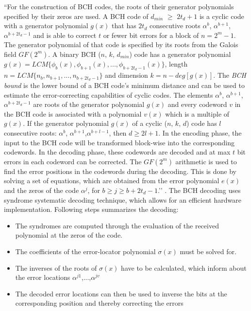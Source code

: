 ``For the construction of BCH codes, the roots of their generator polynomials specified by their zeros are used. A BCH code of $d_{min}$ $\geq$ $2t_d + 1$ is a cyclic code with a generator polynomial $g(x)$ that has $2t_d$ consecutive roots $\alpha^b$, $\alpha^{b+1}$,$\alpha^{b+2t_d-1}$ and is able to correct $t$ or fewer bit errors for a block of $n = 2^m - 1$. The generator polynomial of that code is specified by its roots from the Galois field $GF(2^m)$. A binary BCH ($n$, $k$, $d_{min}$) code
has a generator polynomial $g(x) = LCM\{\phi_{b}(x), \phi_{b+1}(x),...,\phi_{b+2t_{d}-1}(x)\}$, length $n = LCM\{n_b,n_{b+1},...,n_{b+2t_d-1}\}$ and dimension $k = n - deg[g(x)]$. The \emph{BCH bound} is the lower bound of a BCH code’s minimum distance and can be used to estimate the error-correcting capabilities of cyclic codes. The elements $\alpha^b$, $\alpha^{b+1}$,$\alpha^{b+2t_d-1}$ are roots of the generator polynomial $g(x)$ and every codeword $v$ in the BCH code is associated with a
polynomial $v(x)$ which is a multiple of $g(x)$. If the generator polynomial $g(x)$ of a cyclic ($n$, $k$, $d$) code has $l$ consecutive roots: $\alpha^b$, $\alpha^{b+1}$,$\alpha^{b+l-1}$, then $d \geq 2l +1$. In the encoding phase, the input to the BCH code will be transformed block-wise into the corresponding codewords. In the decoding phase, these codewords are decoded and at max $t$ bit errors in each codeword can be corrected. The $GF(2^m)$ arithmetic is used to find the error positions
in the codewords during the decoding. This is done by solving a set of equations, which are obtained from the error polynomial $e(x)$ and the zeros of the code $\alpha^j$, for $b \geq j \geq b + 2t_d - 1$.’’ \cite{66}. The BCH decoding uses syndrome systematic decoding technique, which allows for an efficient hardware implementation. Following steps summarizes the decoding:

\begin{itemize}\itemsep-\the\parsep %
\item The syndromes are computed through the evaluation of the received polynomial at the zeros of the code.
\item The coefficients of the error-locator polynomial $\sigma(x)$ must be solved for.
\item The inverses of the roots of $\sigma(x)$ have to be calculated, which inform about the error locations $\alpha^{j1}$,...,$\alpha^{jv}$
\item The decoded error locations can then be used to inverse the bits at the corresponding position and thereby correcting the errors
\end{itemize}

